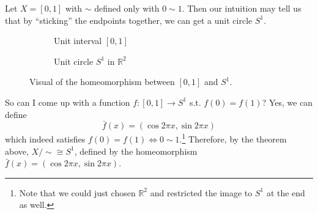     \begin{example}[1-Sphere]
      Let $X = [0, 1]$ with $\sim$ defined only with $0 \sim 1$. Then our intuition may tell us that by ``sticking'' the endpoints together, we can get a unit circle $S^1$. 

      \begin{figure}[H]
        \centering
        \begin{subfigure}[b]{0.48\textwidth}
          \centering
          \caption{Unit interval $[0, 1]$}
          \label{fig:unit-interval}
        \end{subfigure}
        \hfill 
        \begin{subfigure}[b]{0.48\textwidth}
          \centering
          \caption{Unit circle $S^1$ in $\mathbb{R}^2$}
          \label{fig:unit-circle}
        \end{subfigure}
        \caption{Visual of the homeomorphism between $[0, 1]$ and $S^1$.}
        \label{fig:comparison}
      \end{figure}

      So can I come up with a function $f: [0, 1] \rightarrow S^1$ s.t. $f(0) = f(1)$? Yes, we can define 
      \begin{equation}
        \bar{f}(x) = (\cos{2 \pi x}, \sin{2\pi x})
      \end{equation} 
      which indeed satisfies $f(0) = f(1) \iff 0 \sim 1$.\footnote{Note that we could just chosen $\mathbb{R}^2$ and restricted the image to $S^1$ at the end as well.} Therefore, by the theorem above, $X/{\sim} \cong S^1$, defined by the homeomorphism $\bar{f}(x) = (\cos{2 \pi x}, \sin{2\pi x})$.  
    \end{example}

